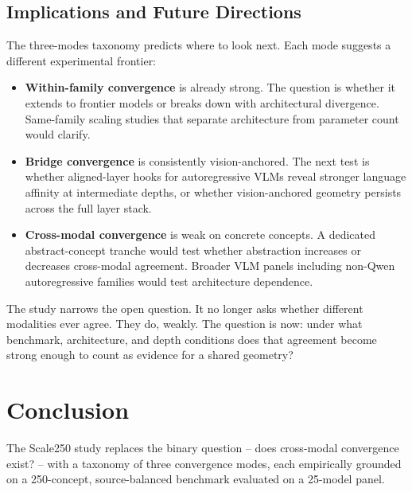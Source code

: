 \documentclass[11pt,a4paper]{article}
\providecommand{\tightlist}{%
  \setlength{\itemsep}{0pt}\setlength{\parskip}{0pt}}
\begin{document}
\subsection{Implications and Future
Directions}\label{implications-and-future-directions}

The three-modes taxonomy predicts where to look next. Each mode suggests
a different experimental frontier:

\begin{itemize}
\tightlist
\item
  \textbf{Within-family convergence} is already strong. The question is
  whether it extends to frontier models or breaks down with
  architectural divergence. Same-family scaling studies that separate
  architecture from parameter count would clarify.
\item
  \textbf{Bridge convergence} is consistently vision-anchored. The next
  test is whether aligned-layer hooks for autoregressive VLMs reveal
  stronger language affinity at intermediate depths, or whether
  vision-anchored geometry persists across the full layer stack.
\item
  \textbf{Cross-modal convergence} is weak on concrete concepts. A
  dedicated abstract-concept tranche would test whether abstraction
  increases or decreases cross-modal agreement. Broader VLM panels
  including non-Qwen autoregressive families would test architecture
  dependence.
\end{itemize}

The study narrows the open question. It no longer asks whether different
modalities ever agree. They do, weakly. The question is now: under what
benchmark, architecture, and depth conditions does that agreement become
strong enough to count as evidence for a shared geometry?

\section{Conclusion}\label{conclusion}

The Scale250 study replaces the binary question -- does cross-modal
convergence exist? -- with a taxonomy of three convergence modes, each
empirically grounded on a 250-concept, source-balanced benchmark
evaluated on a 25-model panel.
\end{document}
